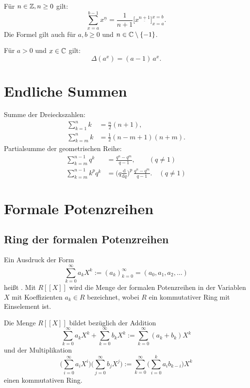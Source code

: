 Für $n\in\mathbb Z,n\ge 0$ gilt:
\begin{equation}
\sum_{x=a}^{b-1} x^{\underline n} = \frac{1}{n+1}\big[x^{\underline{n+1}}\big]_{x=a}^{x=b}.
\end{equation}
Die Formel gilt auch für $a,b\ge 0$ und $n\in\mathbb C\setminus\{-1\}$.

Für $a>0$ und $x\in\mathbb C$ gilt:
\begin{equation}
\Delta(a^x) = (a-1)\,a^x.
\end{equation}

\section{Endliche Summen}
Summe der Dreieckszahlen:
\begin{align}
\sum_{k=1}^n k &= \frac{n}{2}(n+1),\\
\sum_{k=m}^n k &= \frac{1}{2}(n-m+1)(n+m).
\end{align}
Partialsumme der geometrischen Reihe:
\begin{align}
\sum_{k=m}^{n-1} q^k &= \frac{q^n-q^m}{q-1},\qquad (q\ne 1)\\
\sum_{k=m}^{n-1} k^p q^k
&= \Big(q\frac{\mathrm d}{\mathrm dq}\Big)^p\,\frac{q^n-q^m}{q-1}.\quad (q\ne 1)
\end{align}

\section{Formale Potenzreihen}
\subsection{Ring der formalen Potenzreihen}
\begin{Definition}
Ein Ausdruck der Form
\begin{equation}
\sum_{k=0}^\infty a_k X^k := (a_k)_{k=0}^\infty = (a_0,a_1,a_2,\ldots)
\end{equation}
heißt . Mit $R[[X]]$ wird die Menge
der formalen Potenzreihen in der Variablen $X$ mit Koeffizienten
$a_k\in R$ bezeichnet, wobei $R$ ein kommutativer Ring
mit Einselement ist.
\end{Definition}
Die Menge $R[[X]]$ bildet bezüglich der Addition
\begin{equation}
\sum_{k=0}^\infty a_k X^k+\sum_{k=0}^\infty b_k X^k
:= \sum_{k=0}^\infty (a_k+b_k)X^k
\end{equation}
und der Multiplikation
\begin{equation}
\bigg(\sum_{i=0}^\infty a_i X^i\bigg)\bigg(\sum_{j=0}^\infty b_j X^j\bigg)
:= \sum_{k=0}^\infty \bigg(\sum_{i=0}^{k} a_ib_{k-i}\bigg)X^k
\end{equation}
einen kommutativen Ring.

